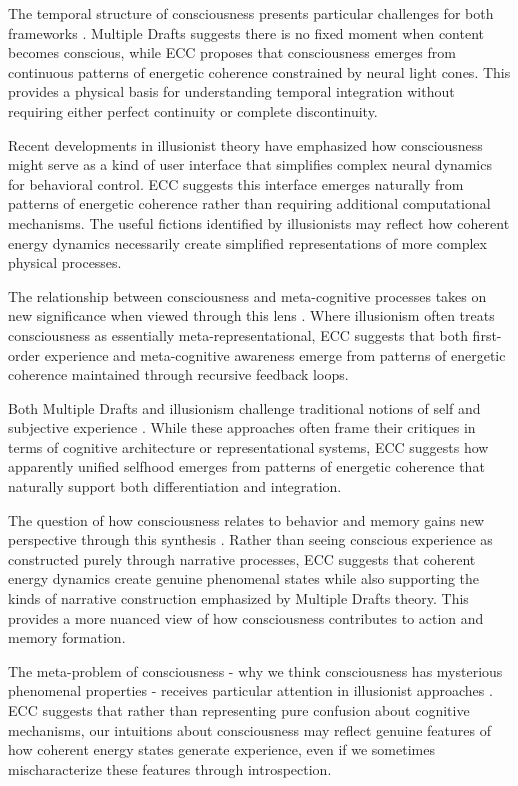 The temporal structure of consciousness presents particular challenges for both frameworks \cite{Blackmore2002}. Multiple Drafts suggests there is no fixed moment when content becomes conscious, while ECC proposes that consciousness emerges from continuous patterns of energetic coherence constrained by neural light cones. This provides a physical basis for understanding temporal integration without requiring either perfect continuity or complete discontinuity.

Recent developments in illusionist theory \cite{Humphrey2011} have emphasized how consciousness might serve as a kind of user interface that simplifies complex neural dynamics for behavioral control. ECC suggests this interface emerges naturally from patterns of energetic coherence rather than requiring additional computational mechanisms. The useful fictions identified by illusionists may reflect how coherent energy dynamics necessarily create simplified representations of more complex physical processes.

The relationship between consciousness and meta-cognitive processes takes on new significance when viewed through this lens \cite{Rey1995}. Where illusionism often treats consciousness as essentially meta-representational, ECC suggests that both first-order experience and meta-cognitive awareness emerge from patterns of energetic coherence maintained through recursive feedback loops.

Both Multiple Drafts and illusionism challenge traditional notions of self and subjective experience \cite{Thompson2014}. While these approaches often frame their critiques in terms of cognitive architecture or representational systems, ECC suggests how apparently unified selfhood emerges from patterns of energetic coherence that naturally support both differentiation and integration.

The question of how consciousness relates to behavior and memory gains new perspective through this synthesis \cite{Dennett1992}. Rather than seeing conscious experience as constructed purely through narrative processes, ECC suggests that coherent energy dynamics create genuine phenomenal states while also supporting the kinds of narrative construction emphasized by Multiple Drafts theory. This provides a more nuanced view of how consciousness contributes to action and memory formation.

The meta-problem of consciousness - why we think consciousness has mysterious phenomenal properties - receives particular attention in illusionist approaches \cite{Frankish2019}. ECC suggests that rather than representing pure confusion about cognitive mechanisms, our intuitions about consciousness may reflect genuine features of how coherent energy states generate experience, even if we sometimes mischaracterize these features through introspection.

